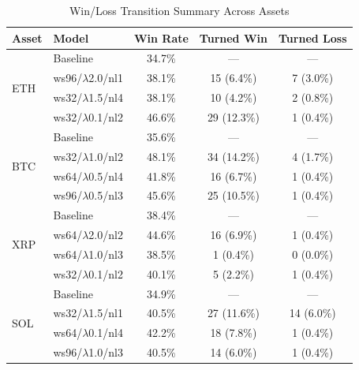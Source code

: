 \documentclass[12pt]{article}
\begin{document}
\begin{table}[H]
\centering
\caption{Win/Loss Transition Summary Across Assets}
\label{tab:transition_summary}
\begin{tabular}{llccc}
\hline
Asset & Model & Win Rate & Turned Win & Turned Loss \\
\hline

\multirow{4}{*}{ETH}
& Baseline             & 34.7\% & ---            & ---            \\
& ws96/$\lambda$2.0/nl1 & 38.1\% & 15 (6.4\%)     & 7 (3.0\%)      \\
& ws32/$\lambda$1.5/nl4 & 38.1\% & 10 (4.2\%)     & 2 (0.8\%)      \\
& ws32/$\lambda$0.1/nl2 & 46.6\% & 29 (12.3\%)    & 1 (0.4\%)      \\

\hline

\multirow{4}{*}{BTC}
& Baseline             & 35.6\% & ---            & ---            \\
& ws32/$\lambda$1.0/nl2 & 48.1\% & 34 (14.2\%)    & 4 (1.7\%)      \\
& ws64/$\lambda$0.5/nl4 & 41.8\% & 16 (6.7\%)     & 1 (0.4\%)      \\
& ws96/$\lambda$0.5/nl3 & 45.6\% & 25 (10.5\%)    & 1 (0.4\%)      \\

\hline

\multirow{4}{*}{XRP}
& Baseline             & 38.4\% & ---            & ---            \\
& ws64/$\lambda$2.0/nl2 & 44.6\% & 16 (6.9\%)     & 1 (0.4\%)      \\
& ws64/$\lambda$1.0/nl3 & 38.5\% & 1 (0.4\%)      & 0 (0.0\%)      \\
& ws32/$\lambda$0.1/nl2 & 40.1\% & 5 (2.2\%)      & 1 (0.4\%)      \\

\hline

\multirow{4}{*}{SOL}
& Baseline             & 34.9\% & ---            & ---            \\
& ws32/$\lambda$1.5/nl1 & 40.5\% & 27 (11.6\%)    & 14 (6.0\%)     \\
& ws64/$\lambda$0.1/nl4 & 42.2\% & 18 (7.8\%)     & 1 (0.4\%)      \\
& ws96/$\lambda$1.0/nl3 & 40.5\% & 14 (6.0\%)     & 1 (0.4\%)      \\

\hline
\end{tabular}
\end{table}
\end{document}

